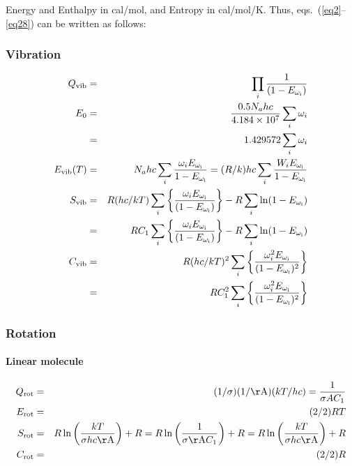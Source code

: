  Energy and Enthalpy in cal/mol, and Entropy in cal/mol/K. Thus, eqs.\
(\ref{eq2}--\ref{eq28}) can be written as follows:

\subsubsection{Vibration}
\begin{eqnarray}
Q_{\rm vib} & = & \prod_i \frac{1 }{ (1 - E_{\rm \omega_i})}  \nonumber\label{eq35}\\
E_0         & = & \frac{0.5 N_a hc}{4.184 \times 10^7}\sum_i {\omega_i}
\nonumber\label{eq36}\\
            & = & 1.429 572 \sum_i {\omega_i}    \nonumber\label{eq37}\\
E_{\rm vib}(T) & = &
N_a h c\sum_i{\frac{\omega_i E_{\rm \omega_i}}{1 - E_{\rm \omega_i}}}
= (R/k) h c\sum_i{\frac{W_ iE_{\rm \omega_i}}{1 - E_{\rm \omega_i}}}     \nonumber\label{eq38}\\
S_{\rm vib} & = & R (hc/kT)
\sum_i\left\{\frac{\omega_i E_{\rm \omega_i}}{(1 - E_{\rm \omega_i})}\right\}
                - R\sum_i {\ln (1 - E_{\rm \omega_i})} \nonumber \\
& = & R C_1\sum_i\left\{\frac{\omega_i E_{\rm \omega_i}}{(1 - E_{\rm \omega_i})}\right\}
- R\sum_i {\ln(1 - E_{\rm \omega_i})}            \nonumber\label{eq39}\\
C_{\rm vib} & = & R (hc/kT)^2
\sum_i\left\{\frac{\omega_i^2 E_{\rm \omega_i}}{(1- E_{\rm \omega_i})^2} \right\} \nonumber \\
& = & R C_1^2
\sum_i\left\{\frac{\omega_i^2 E_{\rm \omega_i}}{(1- E_{\rm \omega_i})^2}\right\}
\nonumber\label{eq40}
\end{eqnarray}

\subsubsection{Rotation}

\paragraph*{Linear molecule}
\begin{eqnarray}
Q_{\rm rot} & = & (1/\sigma) (1/{\rm \AA}) (kT/hc) = \frac{1}{\sigma A C_1}
\nonumber\label{eq41}\\
E_{\rm rot} & = & (2/2)RT   \nonumber\label{eq42} \\
S_{\rm rot} & = & R\ln\left(\frac{kT}{\sigma hc{\rm \AA}}\right) + R
= R\ln \left(\frac{1}{\sigma {\rm \AA} C_1}\right) + R
= R\ln\left(\frac{kT}{\sigma hc{\rm \AA}}\right) + R \nonumber\label{eq43}\\
C_{\rm rot} & = & (2/2)R       \nonumber\label{eq44}
\end{eqnarray}

